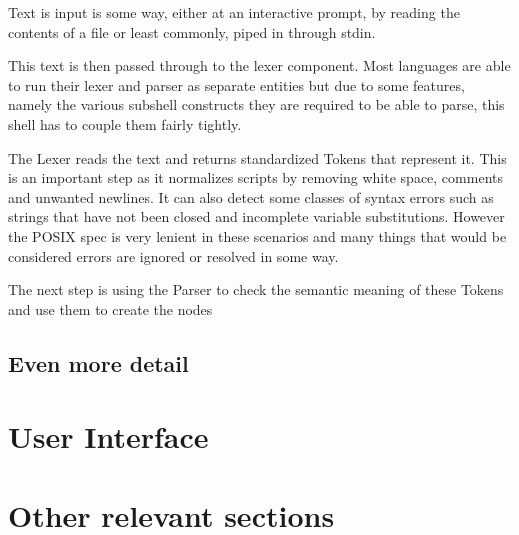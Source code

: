 Text is input is some way, either at an interactive prompt, by reading the contents of a file or least commonly, piped in through stdin.

This text is then passed through to the lexer component.
Most languages are able to run their lexer and parser as separate entities but due to some  features, namely the various subshell constructs they are required to be able to parse, this shell has to couple them fairly tightly.

The Lexer reads the text and returns standardized Tokens that represent it.
This is an important step as it normalizes scripts by removing white space, comments and unwanted newlines.
It can also detect some classes of syntax errors such as strings that have not been closed and incomplete variable substitutions.
However the POSIX spec is very lenient in these scenarios and many things that would be considered errors are ignored or resolved in some way. %

The next step is using the Parser to check the semantic meaning of these Tokens and use them to create the nodes



















\subsection{Even more detail}

\section{User Interface}

\section{Other relevant sections}